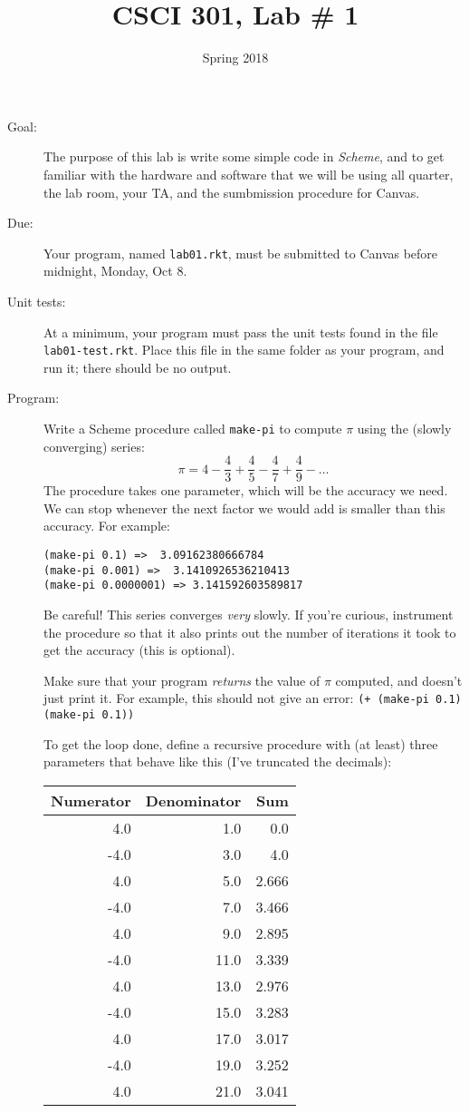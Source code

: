 \documentclass{article}
\title{CSCI 301, Lab \# 1}
\author{Spring 2018}
\date{}
\begin{document}
\maketitle
\begin{multicols}{2}

\begin{description}
\item[Goal:] The purpose of this lab is write some simple code in {\em
  Scheme}, and to get familiar with the hardware and software that we
  will be using all quarter, the lab room, your TA, and the
  sumbmission procedure for Canvas.

\item[Due:] Your program, named {\tt lab01.rkt}, must be submitted to
  Canvas before midnight, Monday, Oct 8.

  \item[Unit tests:]
  At a minimum, your program must pass the unit tests found in the
  file {\tt lab01-test.rkt}.  Place this file in the same folder
  as your program, and run it;  there should be no output.

\item[Program:] Write a {\sc Scheme} procedure called {\tt make-pi} 
to compute $\pi$
  using the (slowly converging) series:
\[
{\pi} = 4 - \frac43 + \frac45 - \frac47 + \frac49 - \ldots
\]
The procedure takes one parameter, which will be the 
accuracy we need.  We can stop whenever the next factor we would
add is smaller than this accuracy.  For example:
\begin{Verbatim}[frame=single]
(make-pi 0.1) =>  3.09162380666784
(make-pi 0.001) =>  3.1410926536210413
(make-pi 0.0000001) => 3.141592603589817
\end{Verbatim}
Be careful!  This series converges {\em very} slowly.  If you're
curious, instrument the procedure so that it also prints out the
number of iterations it took to get the accuracy (this is optional).

Make sure that your program {\em returns} the value of $\pi$ computed,
and doesn't just print it.  For example, this should not give an
error: \verb|(+ (make-pi 0.1) (make-pi 0.1))|


To get the loop done, define a recursive procedure with (at least)
three
parameters that behave like this (I've truncated the decimals):\\
\begin{tabular}{rrr}
 Numerator & Denominator & Sum \\\hline
 4.0 & 1.0 & 0.0\\
 -4.0 & 3.0 & 4.0\\
 4.0 & 5.0 & 2.666\\
 -4.0 & 7.0 & 3.466\\
 4.0 & 9.0 & 2.895\\
 -4.0 & 11.0 & 3.339\\
 4.0 & 13.0 & 2.976\\
 -4.0 & 15.0 & 3.283\\
 4.0 & 17.0 & 3.017\\
 -4.0 & 19.0 & 3.252\\
 4.0 & 21.0 & 3.041\\
\end{tabular}


\end{description}
\end{multicols}
\end{document}
